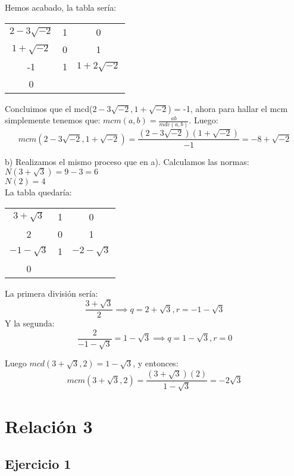\documentclass[11pt, a4paper, titlepage]{article}
\begin{document}
Hemos acabado, la tabla sería:

\begin{center}
\begin{tabular}{c|cc}
$ 2-3\sqrt{-2} $ & 1 & 0 \\
$ 1+\sqrt{-2} $ & 0 & 1 \\
\hline
-1 & 1 & $ 1+2\sqrt{-2}$ \\
\hline
0
\end{tabular}
\end{center}

Concluimos que el mcd($2-3\sqrt{-2},1+\sqrt{-2}$) = -1, ahora para hallar el mcm simplemente tenemos que: $ mcm(a,b) = \frac{ab}{mdc(a,b)} $. Luego:
$$ mcm(2-3\sqrt{-2},1+\sqrt{-2}) = \frac{(2-3\sqrt{-2})(1+\sqrt{-2})}{-1} = -8+\sqrt{-2} $$

b) Realizamos el mismo proceso que en a). Calculamos las normas: \\
$ N(3+\sqrt{3}) = 9 - 3 = 6 $ \\
$ N(2) = 4 $ \\

La tabla quedaría:

\begin{center}
\begin{tabular}{c|cc}
$ 3+\sqrt{3} $ & 1 & 0 \\
2 & 0 & 1 \\
\hline
$ -1-\sqrt{3} $ & 1 & $ -2-\sqrt{3}$ \\
\hline
0
\end{tabular}
\end{center}

La primera división sería:
$$ \frac{3+\sqrt{3}}{2} \implies q = 2+\sqrt{3}, r = -1-\sqrt{3} $$
Y la segunda:
$$ \frac{2}{-1-\sqrt{3}} = 1-\sqrt{3} \implies q = 1-\sqrt{3}, r = 0 $$

Luego $ mcd(3+\sqrt{3},2) = 1-\sqrt{3} $, y entonces:
$$ mcm(3+\sqrt{3},2) = \frac{(3+\sqrt{3})(2)}{1-\sqrt{3}} = -2\sqrt{3} $$





\pagebreak
\section{\Huge{Relación 3}}

\subsection{\LARGE{Ejercicio 1}}
\end{document}
